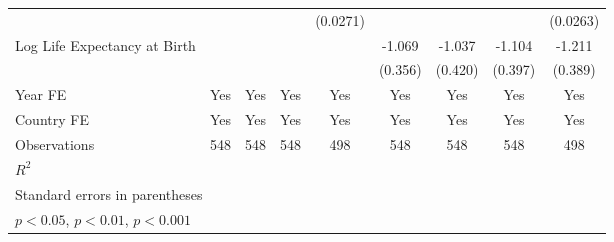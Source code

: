 \begin{table}[htbp]
\begin{tabular}{l*{8}{c}}
                &                  &                  &                  & (0.0271)         &                  &                  &                  & (0.0263)         \\
\addlinespace
Log Life Expectancy at Birth&                  &                  &                  &                  &   -1.069\sym{**} &   -1.037\sym{*}  &   -1.104\sym{**} &   -1.211\sym{**} \\
                &                  &                  &                  &                  &  (0.356)         &  (0.420)         &  (0.397)         &  (0.389)         \\
\addlinespace
Year FE         &      Yes         &      Yes         &      Yes         &      Yes         &      Yes         &      Yes         &      Yes         &      Yes         \\
\addlinespace
Country FE      &      Yes         &      Yes         &      Yes         &      Yes         &      Yes         &      Yes         &      Yes         &      Yes         \\
\midrule
Observations    &      548         &      548         &      548         &      498         &      548         &      548         &      548         &      498         \\
\(R^{2}\)       &                  &                  &                  &                  &                  &                  &                  &                  \\
\bottomrule
\multicolumn{9}{l}{\footnotesize Standard errors in parentheses}\\
\multicolumn{9}{l}{\footnotesize \sym{*} \(p<0.05\), \sym{**} \(p<0.01\), \sym{***} \(p<0.001\)}\\
\end{tabular}
\end{table}

